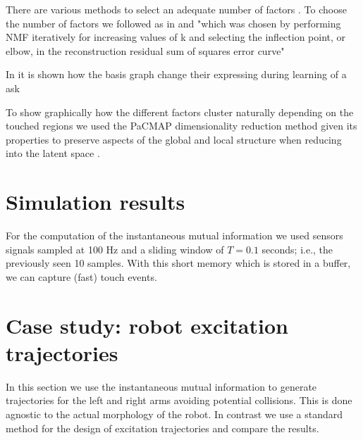   

There are various methods to select an adequate number of factors \cite{Muzzarelli2019RankSelectionNon}. To choose the number of factors we followed as in \cite{Phalen2020Nonnegativematrix} and "which was chosen by performing NMF iteratively for increasing values of k and selecting the inflection point, or elbow, in the reconstruction residual sum of squares
error curve"

In \cite{Stiso2020Learningbraincomputer} it is shown how the basis graph change their expressing during learning of a ask


To show graphically how the different factors cluster naturally depending on the touched regions we used the PaCMAP dimensionality reduction method \cite{Wang2021Understandinghowdimension} given its properties to preserve aspects of the global and local structure when reducing into the latent space \cite{Huang2022Towardscomprehensiveevaluation}.
\section{Simulation results}
\TODO
For the computation of the instantaneous mutual information we used sensors signals sampled at 100 Hz and a sliding window of $T = 0.1$ seconds; i.e., the previously seen 10 samples. With this short memory which is stored in a buffer, we can capture (fast) touch events.

\section{Case study: robot excitation trajectories}
\TODO
In this section we use the instantaneous mutual information to generate trajectories for the left and right arms avoiding potential collisions. This is done agnostic to the actual morphology of the robot. In contrast we use a standard method for the design of excitation trajectories and compare the results.

